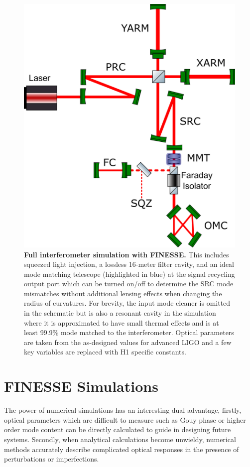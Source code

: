\begin{figure}[ht!]
	\centering
	\includegraphics[width=0.8 \textwidth]{../Figures/FullIFO_FINESSE.png}
	\caption[Full interferometer simulation with FINESSE.]
	{\textbf{Full interferometer simulation with FINESSE.} 
		This includes squeezed light injection, a lossless 16-meter filter cavity, and an ideal mode matching telescope (highlighted in blue) at the signal recycling output port which can be turned on/off to determine the SRC mode mismatches without additional lensing effects when changing the radius of curvatures.  For brevity, the input mode cleaner is omitted in the schematic but is also a resonant cavity in the simulation where it is approximated to have small thermal effects and is at least 99.9\% mode matched to the interferometer.  Optical parameters are taken from the as-designed values for advanced LIGO and a few key variables are replaced with H1 specific constants.
	}
	\label{fig:IFO_FINESSE}
\end{figure}

	\section{FINESSE Simulations}
	The power of numerical simulations has an interesting dual advantage, firstly, optical parameters which are difficult to measure such as Gouy phase or higher order mode content can be directly calculated to guide in designing future systems. Secondly, when analytical calculations become unwieldy, numerical methods accurately describe complicated optical responses in the presence of perturbations or imperfections.
		
